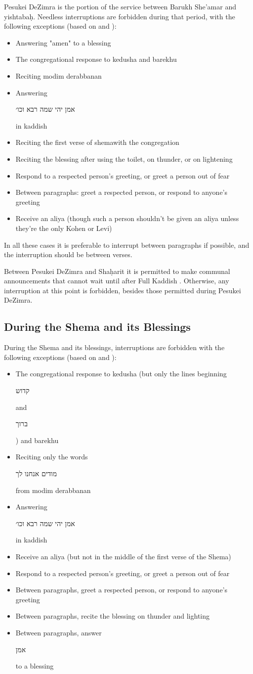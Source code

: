 \documentclass[11pt]{article}
\newcommand{\hebword}[1]{‎\begin{hebrew}\beginR #1 \endR\end{hebrew}}
\begin{document}
Pesukei DeZimra is the portion of the service between Barukh She'amar and yishtaba\d{h}. Needless interruptions are forbidden during that period, with the following exceptions (based on \cite*["Table of Permitted Responses"]{Koren} and \cite*[16:5]{PH}):
\begin{itemize}
	\item Answering "amen" to a blessing 
	\item The congregational response to kedusha and barekhu
	\item Reciting modim derabbanan
	\item Answering \hebword{אמן יהי שמה רבא וכו׳} in kaddish
	\item Reciting the first verse of shema\space with the congregation
	\item Reciting the blessing after using the toilet, on thunder, or on lightening
	\item Respond to a respected person's greeting, or greet a person out of fear
	\item Between paragraphs: greet a respected person, or respond to anyone's greeting
	\item Receive an aliya (though such a person shouldn't be given an aliya unless they're the only Kohen or Levi)
\end{itemize}

In all these cases it is preferable to interrupt between paragraphs if possible, and the interruption should be between verses.

Between Pesukei DeZimra and Sha\d{h}arit it is permitted to make communal announcements that cannot wait until after Full Kaddish \parencite*[16:2]{PH}.  Otherwise, any interruption at this point is forbidden, besides those permitted during Pesukei DeZimra.

\subsection{During the Shema and its Blessings}

During the Shema and its blessings, interruptions are forbidden with the following exceptions (based on \cite*["Table of Permitted Responses"]{Koren} and \cite*[16:5]{PH}):
\begin{itemize}
	\item The congregational response to kedusha (but only the lines beginning \hebword{קדוש} and \hebword{ברוך}) and barekhu
	\item Reciting only the words \hebword{מודים אנחנו לך} from modim derabbanan
	\item Answering \hebword{אמן יהי שמה רבא וכו׳} in kaddish
	\item Receive an aliya (but not in the middle of the first verse of the Shema)
	\item Respond to a respected person's greeting, or greet a person out of fear
	\item Between paragraphs, greet a respected person, or respond to anyone's greeting
	\item Between paragraphs, recite the blessing on thunder and lighting
	\item Between paragraphs, answer \hebword{אמן} to a blessing
\end{itemize}
\end{document}
